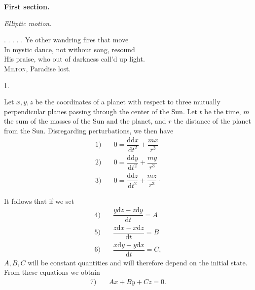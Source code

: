 \par{}\bigskip
{}
\begin{center}
{\large\bfseries First section.\par}
\medskip\textit{Elliptic motion.}
\end{center}
\begin{flushright}
\begin{minipage}{.94\textwidth}
\small\raggedright
. . . . . Ye other wandring fires that move\\
In mystic dance, not without song, resound\\
His praise, who out of darkness call’d up light.\\
\hspace*{2em}\textsc{Milton}, Paradise lost.
\end{minipage}
\end{flushright}
\begin{center}1.\end{center}
\noindent\hspace*{\parindent}Let \(x,y,z\) be the coordinates of a planet with respect to three mutually perpendicular planes passing through the center of the Sun. Let \(t\) be the time, \(m\) the sum of the masses of the Sun and the planet, and \(r\) the distance of the planet from the Sun. Disregarding perturbations, we then have
\[
\begin{array}{rl}
1)\quad&0=\dfrac{\mathrm{dd}x}{\mathrm{d}t^2}+\dfrac{mx}{r^3}\\[5pt]
2)\quad&0=\dfrac{\mathrm{dd}y}{\mathrm{d}t^2}+\dfrac{my}{r^3}\\[5pt]
3)\quad&0=\dfrac{\mathrm{dd}z}{\mathrm{d}t^2}+\dfrac{mz}{r^3}\mathpunct{\cdot}
\end{array}
\]
\par It follows that if we set
\[
\begin{array}{rl}
4)\quad&\dfrac{y\mathrm{d}z-z\mathrm{d}y}{\mathrm{d}t}=A\\[5pt]
5)\quad&\dfrac{z\mathrm{d}x-x\mathrm{d}z}{\mathrm{d}t}=B\\[5pt]
6)\quad&\dfrac{x\mathrm{d}y-y\mathrm{d}x}{\mathrm{d}t}=C,
\end{array}
\]
\(A,B,C\) will be constant quantities and will therefore depend on the initial state. From these equations we obtain
\[
\begin{array}{rl}7)\quad&Ax+By+Cz=0.\end{array}
\]
